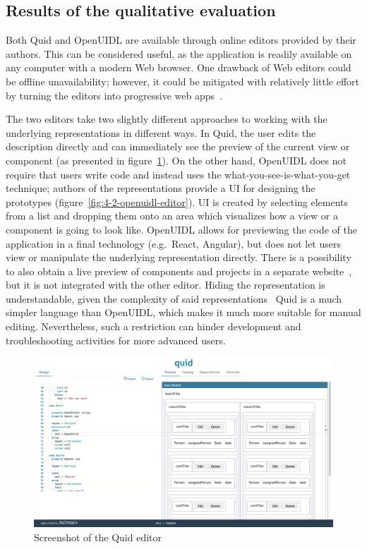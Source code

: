 \subsection{Results of the qualitative evaluation}\label{subsec:results-of-the-qualitative-evaluation}
Both Quid and OpenUIDL are available through online editors provided by their authors.
This can be considered useful, as the application is readily available on any computer with a modern Web browser.
One drawback of Web editors could be offline unavailability;
however, it could be mitigated with relatively little effort by turning the editors into progressive web apps~.

The two editors take two slightly different approaches to working with the underlying representations in different ways.
In Quid, the user edits the description directly and can immediately see the preview of the current view or component (as presented in figure~\ref{fig:4-2-quid-editor}).
On the other hand, OpenUIDL does not require that users write code and instead uses the what-you-see-is-what-you-get technique; authors of the representations provide a UI for designing the prototypes (figure~\ref{fig:4-2-openuidl-editor}).
UI is created by selecting elements from a list and dropping them onto an area which visualizes how a view or a component is going to look like.
OpenUIDL allows for previewing the code of the application in a final technology (e.g.\ React, Angular), but does not let users view or manipulate the underlying representation directly.
There is a possibility to also obtain a live preview of components and projects in a separate website~, but it is not integrated with the other editor.
Hiding the representation is understandable, given the complexity of said representations \textendash\ Quid is a much simpler language than OpenUIDL, which makes it much more suitable for manual editing.
Nevertheless, such a restriction can hinder development and troubleshooting activities for more advanced users.

\begin{figure}
    \centering
    \includegraphics[width=\textwidth]{4-results-and-discussion/quid-editor}
    \caption{Screenshot of the Quid editor}
    \label{fig:4-2-quid-editor}
\end{figure}

